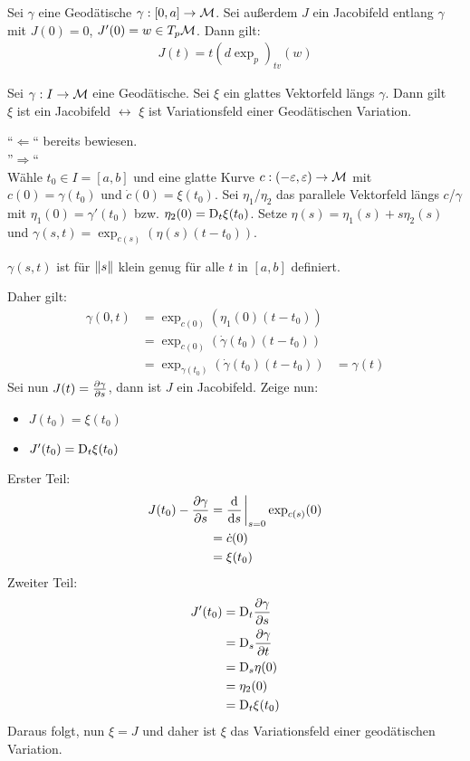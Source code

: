 \begin{lem}
    Sei $\gamma$ eine Geodätische $\gamma : [0,a]\to\mathcal{M}$.
    Sei außerdem $J$ ein Jacobifeld entlang $\gamma$ mit 
    $J(0)=0$, $J'(0)=w \in T_p\mathcal{M}$.
    Dann gilt:
    \begin{align*}
        J(t) = t (d \exp_p)_{tv} (w)
    \end{align*}
\end{lem}

\begin{satz}
    Sei $\gamma : I \to \mathcal{M}$ eine Geodätische.
    Sei $\xi$ ein glattes Vektorfeld längs $\gamma$.
    Dann gilt\\
    $\xi$ ist ein Jacobifeld $\leftrightarrow$ $\xi$ ist Variationsfeld einer Geodätischen Variation.
\end{satz}


\begin{bew}
``$\Leftarrow$`` bereits bewiesen.\\
''$\Rightarrow$``\\
Wähle $t_0\in I = [a, b]$ und eine glatte Kurve $c : (-\varepsilon, \varepsilon) \to \mathcal{M}$
mit $c(0) = \gamma(t_0)$ und $\dot{c}(0)=\xi (t_0)$.
Sei $\eta_1$/$\eta_2$  das parallele Vektorfeld längs $c$/$\gamma$ mit $\eta_1 (0) = \gamma' (t_0)$
bzw. $\eta_2(0)=\mathrm{D}_t \xi (t_0)$.
Setze $\eta (s) = \eta_1 (s) + s \eta_2 (s)$ und
$\gamma (s,t) = \exp_{c(s)} (\eta (s) (t-t_0))$.
\begin{bem}
    $\gamma (s,t)$ ist für $\norm {s}$ klein genug für alle $t$ in $[a, b]$ definiert.
\end{bem}
Daher gilt:
\begin{align*}
\gamma (0,t) &= \exp_{c(0)} (\eta_1(0) (t-t_0))\\
&=\exp_{c(0)} (\dot{\gamma}(t_0) (t-t_0))\\
&=\exp_{\gamma(t_0)} (\dot{\gamma}(t_0) (t-t_0)) 
&= \gamma(t)
\end{align*}
Sei nun $J(t) = \pdv{\gamma}{s}(0,t)$, dann ist $J$ ein Jacobifeld.
Zeige nun:
\begin{itemize}
    \item $J(t_0) = \xi (t_0)$
    \item $J'(t_0) = \mathrm{D}_t \xi (t_0)$
\end{itemize}
Erster Teil:
\begin{align*}
    J(t_0 ) - \pdv{\gamma}{s}(0,t_0) &= \dv{s}\eval_{s=0} \exp_{c(s)} (0)\\
    &= \dot{c}(0)\\
    &= \xi (t_0)
\end{align*}
Zweiter Teil:
\begin{align*}
J'(t_0) &= \mathrm{D}_t \pdv{\gamma}{s}(0,t_0)\\
&= \mathrm{D}_s \pdv{\gamma}{t}(0,t_0)\\
&= \mathrm{D}_s \eta(0)\\
&= \eta_2(0)\\
&= \mathrm{D}_t \xi (t_0)
\end{align*}
Daraus folgt, nun $\xi = J$ und daher ist $\xi$ das Variationsfeld einer geodätischen Variation.
\end{bew}

